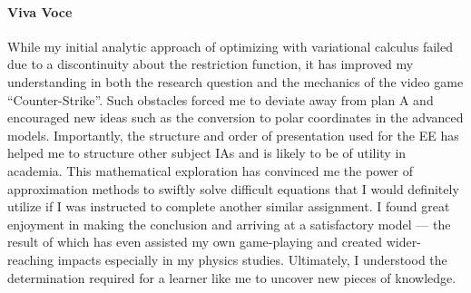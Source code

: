\documentclass[a4paper,12pt]{article}
\begin{document}
\paragraph{Viva Voce}
While my initial analytic approach of optimizing with variational calculus failed due to a discontinuity about the restriction function, it has improved my understanding in both the research question and the mechanics of the video game ``Counter-Strike''. Such obstacles forced me to deviate away from plan A and encouraged new ideas such as the conversion to polar coordinates in the advanced models. Importantly, the structure and order of presentation used for the EE has helped me to structure other subject IAs and is likely to be of utility in academia. This mathematical exploration has convinced me the power of approximation methods to swiftly solve difficult equations that I would definitely utilize if I was instructed to complete another similar assignment. I found great enjoyment in making the conclusion and arriving at a satisfactory model --- the result of which has even assisted my own game-playing and created wider-reaching impacts especially in my physics studies. Ultimately, I understood the determination required for a learner like me to uncover new pieces of knowledge.
\end{document}
